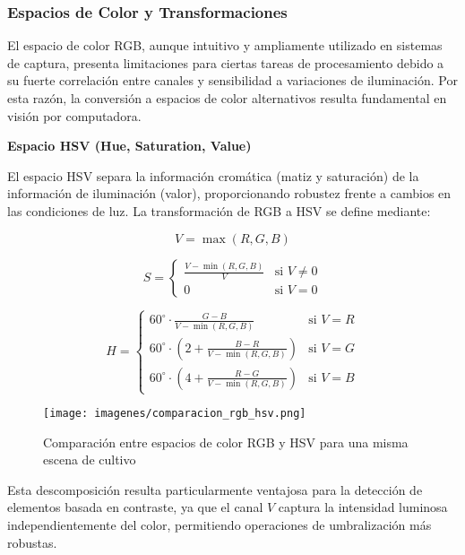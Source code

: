 \subsubsection{Espacios de Color y Transformaciones}

El espacio de color RGB, aunque intuitivo y ampliamente utilizado en sistemas de captura, presenta limitaciones para ciertas tareas de procesamiento debido a su fuerte correlación entre canales y sensibilidad a variaciones de iluminación. Por esta razón, la conversión a espacios de color alternativos resulta fundamental en visión por computadora.

\textbf{Espacio HSV (Hue, Saturation, Value)}

El espacio HSV separa la información cromática (matiz y saturación) de la información de iluminación (valor), proporcionando robustez frente a cambios en las condiciones de luz. La transformación de RGB a HSV se define mediante:

\begin{equation}
V = \max(R, G, B)
\end{equation}

\begin{equation}
S = \begin{cases}
\frac{V - \min(R,G,B)}{V} & \text{si } V \neq 0 \\
0 & \text{si } V = 0
\end{cases}
\end{equation}

\begin{equation}
H = \begin{cases}
60^\circ \cdot \frac{G-B}{V - \min(R,G,B)} & \text{si } V = R \\
60^\circ \cdot \left(2 + \frac{B-R}{V - \min(R,G,B)}\right) & \text{si } V = G \\
60^\circ \cdot \left(4 + \frac{R-G}{V - \min(R,G,B)}\right) & \text{si } V = B
\end{cases}
\end{equation}

\begin{figure}[h]
\centering
\texttt{[image: imagenes/comparacion\_rgb\_hsv.png]}
\caption{Comparación entre espacios de color RGB y HSV para una misma escena de cultivo}
\label{fig:comparacion_rgb_hsv}
\end{figure}

Esta descomposición resulta particularmente ventajosa para la detección de elementos basada en contraste, ya que el canal $V$ captura la intensidad luminosa independientemente del color, permitiendo operaciones de umbralización más robustas.

